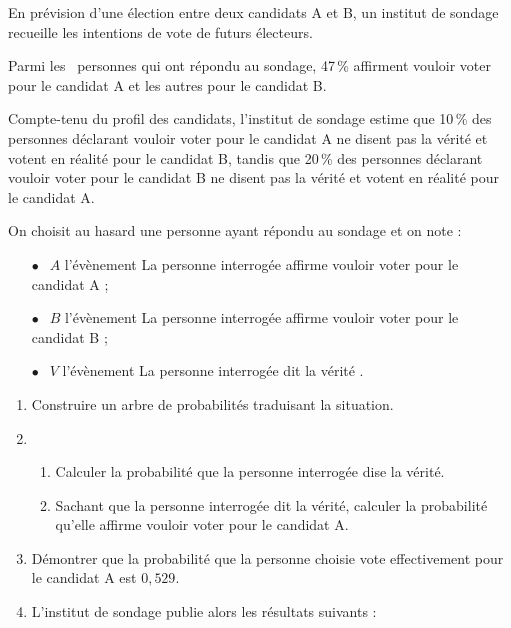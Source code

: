 \documentclass[12pt,frenchb]{article}
\begin{document}
\begin{question}[subtitle={Liban 2015}]
En prévision d'une élection entre deux candidats A et B, un institut de sondage recueille les
intentions de vote de futurs électeurs.

Parmi les ~personnes qui ont répondu au sondage, 47\,\% affirment vouloir voter pour le
candidat A et les autres pour le candidat B.

\medskip

Compte-tenu du profil des candidats, l'institut de sondage estime que 10\,\% des personnes
déclarant vouloir voter pour le candidat A ne disent pas la vérité et votent en réalité pour
le candidat B, tandis que 20\,\% des personnes déclarant vouloir voter pour le candidat B ne
disent pas la vérité et votent en réalité pour le candidat A.

\medskip

On choisit au hasard une personne ayant répondu au sondage et on note :

\setlength\parindent{6mm}
\begin{itemize}
\item[$\bullet~~$] $A$ l'évènement \og La personne interrogée affirme vouloir voter pour le candidat A \fg{} ;
\item[$\bullet~~$] $B$ l'évènement \og La personne interrogée affirme vouloir voter pour le candidat B \fg{} ;
\item[$\bullet~~$] $V$ l'évènement \og La personne interrogée dit la vérité \fg.
\end{itemize}
\setlength\parindent{0mm}

\medskip

\begin{enumerate}
\item Construire un arbre de probabilités traduisant la situation.
\item  
	\begin{enumerate}
		\item Calculer la probabilité que la personne interrogée dise la vérité.
		\item Sachant que la personne interrogée dit la vérité, calculer la probabilité qu'elle
affirme vouloir voter pour le candidat A.
	\end{enumerate}
\item  Démontrer que la probabilité que la personne choisie vote effectivement pour le candidat
A est $0,529$.
\item  L'institut de sondage publie alors les résultats suivants :  
	

\end{enumerate}
\end{question}
\end{document}
